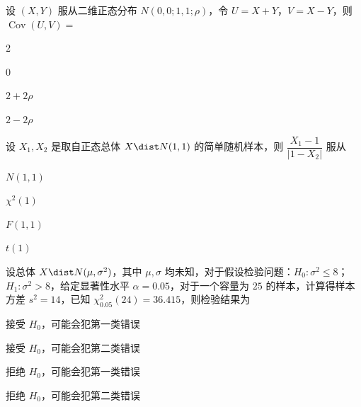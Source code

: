 \begin{question}[index=8]
设 $(X,Y)$ 服从二维正态分布 $N(0,0;1,1;\rho)$，令 $U=X+Y$，$V=X-Y$，则 $\operatorname{Cov}(U,V)=$
\begin{choices}[columns=4]
\item $2$
\item $0$
\item $2+2\rho$
\item $2-2\rho$
\end{choices}
\end{question}
\QuestionBreak

\begin{question}[index=9]
设 $X_1,X_2$ 是取自正态总体 $X\dist N(1,1)$ 的简单随机样本，则 $\dfrac{X_1-1}{|1-X_2|}$ 服从
\begin{choices}[columns=4]
\item $N(1,1)$
\item $\chi^2(1)$
\item $F(1,1)$
\item $t(1)$
\end{choices}
\end{question}
\QuestionBreak

\begin{question}[index=10]
设总体 $X\dist N(\mu,\sigma^2)$，其中 $\mu,\sigma$ 均未知，对于假设检验问题：$H_0:\sigma^2\le8$；$H_1:\sigma^2>8$，给定显著性水平 $\alpha=0.05$，对于一个容量为 $25$ 的样本，计算得样本方差 $s^2=14$，已知 $\chi_{0.05}^2(24)=36.415$，则检验结果为
\begin{choices}[columns=2]
\item 接受 $H_0$，可能会犯第一类错误
\item 接受 $H_0$，可能会犯第二类错误
\item 拒绝 $H_0$，可能会犯第一类错误
\item 拒绝 $H_0$，可能会犯第二类错误
\end{choices}
\end{question}
